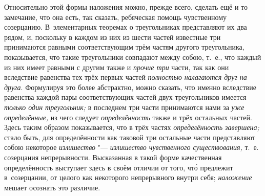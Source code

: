 Относительно этой формы наложения можно, прежде всего, сделать ещё и то
замечание, что она есть, так сказать, ребяческая помощь чувственному
созерцанию. В~элементарных теоремах о треугольниках представляют их два рядом,
и, поскольку в каждом из них из шести частей известные три принимаются равными
соответствующим трём частям другого треугольника, показывается, что такие
треугольники совпадают между собою, т.~е., что каждый из них имеет равными с
другим также и {\em прочие три} части, так как они вследствие равенства тех
трёх первых частей {\em полностью налагаются друг на друга}. Формулируя это
более абстрактно, можно сказать, что именно вследствие равенства каждой пары
соответствующих частей двух треугольников имеется {\em только один
треугольник;} в последнем три части принимаются нами за {\em уже определённые,}
из чего следует {\em определённость} также и трёх остальных частей. Здесь таким
образом показывается, что в трёх частях {\em определённость завершена;} стало
быть, для определённости как таковой три остальные части представляют собою
некоторое {\em излишество} "--- {\em излишество чувственного существования,}
т.~е. созерцания непрерывности. Высказанная в такой форме качественная
определённость выступает здесь в своём отличии от того, чт\'{о} предлежит
в~созерцании, от целого как некоторого непрерывного внутри себя;
{\em наложение} мешает осознать это различие.

